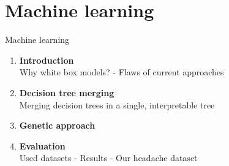 \documentclass[english]{beamer}
\begin{document}
\section{Machine learning}
\begin{frame}{Machine learning}
	\centering
	\begin{figure}
	\end{figure}
\end{frame}
\begin{frame}{}
	\begin{enumerate}
		\item \textbf{Introduction} \\
		\scriptsize Why white box models? - Flaws of current approaches \normalsize
		\item  \textbf{Decision tree merging} \\
		\scriptsize Merging decision trees in a single, interpretable tree \normalsize
		\item  \textbf{Genetic approach} \\
		\item  \textbf{Evaluation} \\
		\scriptsize Used datasets - Results - Our headache dataset \normalsize
	\end{enumerate}
\end{frame}
\end{document}
